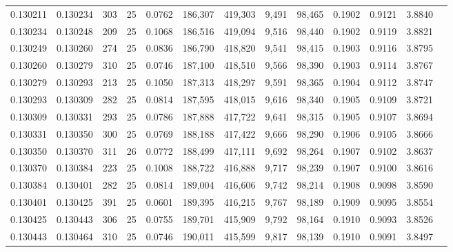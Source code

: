 \begin{tabular}{rrrrrrrrrrrrr}
0.130211 & 0.130234 &   303 &  25 &                                     0.0762 & 186,307 & 419,303 &   9,491 &  98,465 & 0.1902 & 0.9121 & 3.8840 \\
0.130234 & 0.130248 &   209 &  25 &                                     0.1068 & 186,516 & 419,094 &   9,516 &  98,440 & 0.1902 & 0.9119 & 3.8821 \\
0.130249 & 0.130260 &   274 &  25 &                                     0.0836 & 186,790 & 418,820 &   9,541 &  98,415 & 0.1903 & 0.9116 & 3.8795 \\
0.130260 & 0.130279 &   310 &  25 &                                     0.0746 & 187,100 & 418,510 &   9,566 &  98,390 & 0.1903 & 0.9114 & 3.8767 \\
0.130279 & 0.130293 &   213 &  25 &                                     0.1050 & 187,313 & 418,297 &   9,591 &  98,365 & 0.1904 & 0.9112 & 3.8747 \\
0.130293 & 0.130309 &   282 &  25 &                                     0.0814 & 187,595 & 418,015 &   9,616 &  98,340 & 0.1905 & 0.9109 & 3.8721 \\
0.130309 & 0.130331 &   293 &  25 &                                     0.0786 & 187,888 & 417,722 &   9,641 &  98,315 & 0.1905 & 0.9107 & 3.8694 \\
0.130331 & 0.130350 &   300 &  25 &                                     0.0769 & 188,188 & 417,422 &   9,666 &  98,290 & 0.1906 & 0.9105 & 3.8666 \\
0.130350 & 0.130370 &   311 &  26 &                                     0.0772 & 188,499 & 417,111 &   9,692 &  98,264 & 0.1907 & 0.9102 & 3.8637 \\
0.130370 & 0.130384 &   223 &  25 &                                     0.1008 & 188,722 & 416,888 &   9,717 &  98,239 & 0.1907 & 0.9100 & 3.8616 \\
0.130384 & 0.130401 &   282 &  25 &                                     0.0814 & 189,004 & 416,606 &   9,742 &  98,214 & 0.1908 & 0.9098 & 3.8590 \\
0.130401 & 0.130425 &   391 &  25 &                                     0.0601 & 189,395 & 416,215 &   9,767 &  98,189 & 0.1909 & 0.9095 & 3.8554 \\
0.130425 & 0.130443 &   306 &  25 &                                     0.0755 & 189,701 & 415,909 &   9,792 &  98,164 & 0.1910 & 0.9093 & 3.8526 \\
0.130443 & 0.130464 &   310 &  25 &                                     0.0746 & 190,011 & 415,599 &   9,817 &  98,139 & 0.1910 & 0.9091 & 3.8497 \\

\end{tabular}
